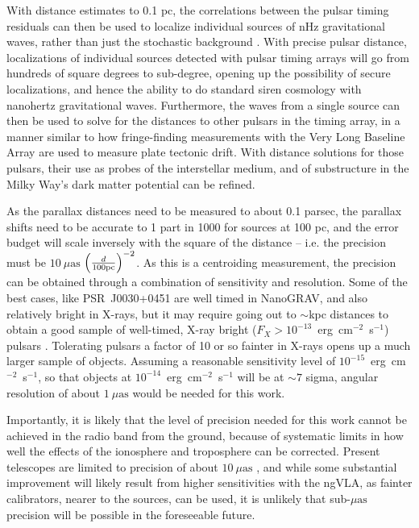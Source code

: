 \documentclass[fleqn,10pt]{SelfArx}
\begin{document}
With distance estimates to 0.1 pc, the correlations between the pulsar timing residuals can then be used to localize individual sources of nHz gravitational waves, rather than just the stochastic background \citep{2011MNRAS.414.3251L,2026arXiv260310120T, 2026ChPhL..43f1102W}. With precise pulsar distance, localizations of individual sources detected with pulsar timing arrays will go from hundreds of square degrees to sub-degree, opening up the possibility of secure localizations, and hence the ability to do standard siren cosmology with nanohertz gravitational waves. Furthermore, the waves from a single source can then be used to solve for the distances to other pulsars in the timing array, in a manner similar to how fringe-finding measurements with the Very Long Baseline Array are used to measure plate tectonic drift. With distance solutions for those pulsars, their use as probes of the interstellar medium, and of substructure in the Milky Way's dark matter potential can be refined.

As the parallax distances need to be measured to about 0.1 parsec, the parallax shifts need to be accurate to 1 part in 1000 for sources at 100 pc, and the error budget will scale inversely with the square of the  distance -- i.e. the precision must be $10~\mu\text{as}$ $\left(\frac{d}{100 {\rm pc}}\right)^{-2}$. As this is a centroiding measurement, the precision can be obtained through a combination of sensitivity and resolution. Some of the best cases, like PSR~J0030+0451 are well timed in NanoGRAV, and also relatively bright in X-rays, but it may require going out to $\sim$kpc distances to obtain a good sample of well-timed, X-ray bright ($F_X>10^{-13}$~erg~cm$^{-2}$~s$^{-1}$) pulsars \citep{2021cosp...43E1186R}. Tolerating pulsars a factor of 10 or so fainter in X-rays opens up a much larger sample of objects. Assuming a reasonable sensitivity level of $10^{-15}$~erg~cm$^{-2}$~s$^{-1}$, so that objects at $10^{-14}$~erg~cm$^{-2}$~s$^{-1}$ will be at $\sim7$ sigma, angular resolution of about $1~\mu\text{as}$ would be needed for this work.

Importantly, it is likely that the level of precision needed for this work cannot be achieved in the radio band from the ground, because of systematic limits in how well the effects of the ionosphere and troposphere can be corrected. Present telescopes are limited to precision of about $10~\mu\text{as}$ \citep{2014ARA&A..52..339R}, and while some substantial improvement will likely result from higher sensitivities with the ngVLA, as fainter calibrators, nearer to the sources, can be used, it is unlikely that sub-$\mu\text{as}$ precision will be possible in the foreseeable future.


\end{document}
